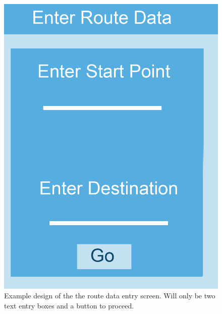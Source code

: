 \begin{figure}[H]
\includegraphics[scale=0.5]{Chapter2/rd.png} 
\caption[Route Data Example]{Example design of the the route data entry screen. Will only be two text entry boxes and a button to proceed.}
\end{figure}
\newpage